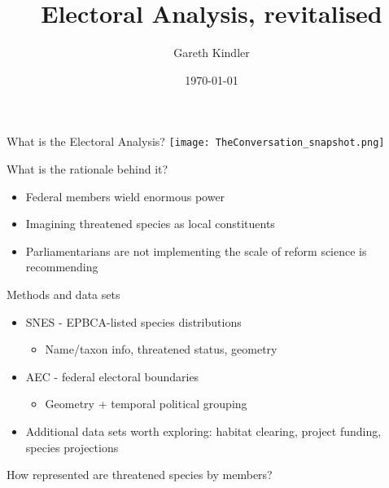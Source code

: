 \documentclass{beamer}
\title{Electoral Analysis, revitalised}
\author{Gareth Kindler}
\date{\today}
\begin{document}
\frame{\titlepage}

\begin{frame}{What is the Electoral Analysis?}
    \texttt{[image: TheConversation\_snapshot.png]}
\end{frame}

\begin{frame}{What is the rationale behind it?}
\begin{itemize}
    \item<1-> Federal members wield enormous power
    \item<2-> Imagining threatened species as local constituents
    \item<3-> Parliamentarians are not implementing the scale of reform science is recommending
\end{itemize}
\end{frame}

\begin{frame}{Methods and data sets}
\begin{itemize}
    \item<1-> SNES - EPBCA-listed species distributions
    \begin{itemize}
        \item Name/taxon info, threatened status, geometry
    \end{itemize}
    \item<2-> AEC - federal electoral boundaries
    \begin{itemize}
        \item Geometry + temporal political grouping
    \end{itemize}
    \item<3-> Additional data sets worth exploring: habitat clearing, project funding, species projections
\end{itemize}
\end{frame}

\begin{frame}{How represented are threatened species by members?}
\end{frame}
\end{document}
